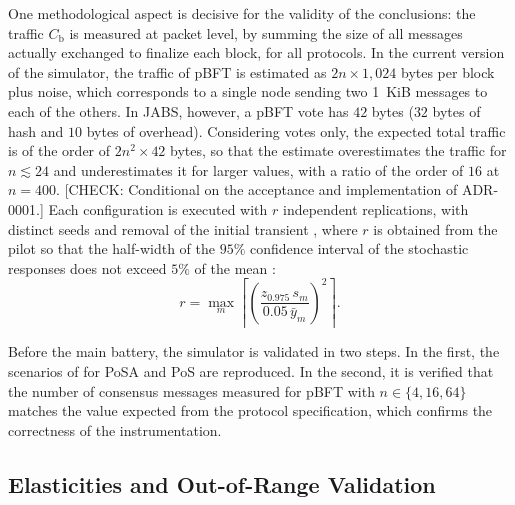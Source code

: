 \documentclass[english]{sbc2025}%
\newcommand{\chk}[1]{\textcolor{orange!80!black}{[CHECK: #1]}}
\newcommand{\Cb}{C_{\mathrm{b}}}
\begin{document}
One methodological aspect is decisive for the validity of the conclusions: the traffic $\Cb$ is measured at packet level, by summing the size of all messages actually exchanged to finalize each block, for all protocols. In the current version of the simulator, the traffic of pBFT is estimated as $2n \times 1{,}024$ bytes per block plus noise, which corresponds to a single node sending two 1~KiB messages to each of the others. In JABS, however, a pBFT vote has $42$ bytes ($32$ bytes of hash and $10$ bytes of overhead). Considering votes only, the expected total traffic is of the order of $2n^{2} \times 42$ bytes, so that the estimate overestimates the traffic for $n \lesssim 24$ and underestimates it for larger values, with a ratio of the order of $16$ at $n = 400$. \chk{Conditional on the acceptance and implementation of ADR-0001.} Each configuration is executed with $r$ independent replications, with distinct seeds and removal of the initial transient \citep{Law2015}, where $r$ is obtained from the pilot so that the half-width of the $95\%$ confidence interval of the stochastic responses does not exceed $5\%$ of the mean \citep{Jain1991}:
\begin{equation}
r = \max_{m}\left\lceil \left( \frac{z_{0.975}\, s_{m}}{0.05\, \bar{y}_{m}} \right)^{2} \right\rceil.
\label{eq:reps}
\end{equation}

Before the main battery, the simulator is validated in two steps. In the first, the scenarios of \citep{Caburlao2026clei} for PoSA and PoS are reproduced. In the second, it is verified that the number of consensus messages measured for pBFT with $n \in \{4, 16, 64\}$ matches the value expected from the protocol specification, which confirms the correctness of the instrumentation.

\subsection{Elasticities and Out-of-Range Validation}
\end{document}
